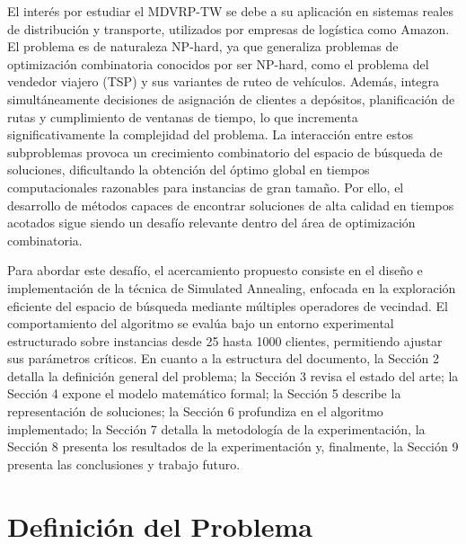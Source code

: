 \documentclass[letter, 10pt, dvipdfmx]{article}
\begin{document}
El interés por estudiar el MDVRP-TW se debe a su aplicación en sistemas reales de distribución y transporte, utilizados por empresas de logística como Amazon.
El problema es de naturaleza NP-hard, ya que generaliza problemas de optimización combinatoria conocidos por ser NP-hard,
como el problema del vendedor viajero (TSP) y sus variantes de ruteo de vehículos. Además,
integra simultáneamente decisiones de asignación de clientes a depósitos, planificación de rutas y cumplimiento
de ventanas de tiempo, lo que incrementa significativamente la complejidad del problema. La interacción entre estos
subproblemas provoca un crecimiento combinatorio del espacio de búsqueda de soluciones, dificultando la obtención del
óptimo global en tiempos computacionales razonables para instancias de gran tamaño. Por ello, el desarrollo de métodos
capaces de encontrar soluciones de alta calidad en tiempos acotados sigue siendo un desafío relevante dentro del área
de optimización combinatoria.

Para abordar este desafío, el acercamiento propuesto consiste en el diseño e implementación de la técnica de
Simulated Annealing, enfocada en la exploración eficiente del espacio de búsqueda mediante múltiples operadores de vecindad.
El comportamiento del algoritmo se evalúa bajo un entorno experimental estructurado sobre instancias
desde 25 hasta 1000 clientes, permitiendo ajustar sus parámetros críticos.
En cuanto a la estructura del documento, la Sección 2 detalla la definición general del problema; la Sección 3
revisa el estado del arte; la Sección 4 expone el modelo matemático formal; la Sección 5
describe la representación de soluciones; la Sección 6 profundiza en el algoritmo implementado;
la Sección 7 detalla la metodología de la experimentación, la Sección 8 presenta los resultados de la experimentación y, finalmente,
la Sección 9 presenta las conclusiones y trabajo futuro.

\section{Definición del Problema}
\end{document}
